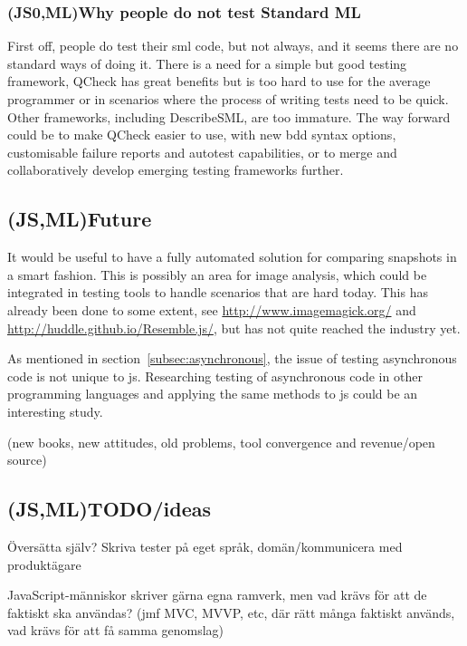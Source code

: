 \documentclass[11pt]{article}
\begin{document}
\subsubsection{(JS0,ML)Why people do not test Standard ML}
\label{subsubsec:whynotsml}

First off, people do test their \gls{sml} code, but not always, and it seems there are no standard ways of doing it. There is a need for a simple but good testing framework, QCheck has great benefits but is too hard to use for the average programmer or in scenarios where the process of writing tests need to be quick. Other frameworks, including DescribeSML, are too immature. The way forward could be to make QCheck easier to use, with new \gls{bdd} syntax options, customisable failure reports and autotest capabilities, or to merge and collaboratively develop emerging testing frameworks further.

\subsection{(JS,ML)Future}

It would be useful to have a fully automated solution for comparing snapshots in a smart fashion. This is possibly an area for image analysis, which could be integrated in testing tools to handle scenarios that are hard today. This has already been done to some extent, see \url{http://www.imagemagick.org/} and \url{http://huddle.github.io/Resemble.js/}, but has not quite reached the industry yet.

As mentioned in section~\ref{subsec:asynchronous}, the issue of testing asynchronous code is not unique to \gls{js}. Researching testing of asynchronous code in other programming languages and applying the same methods to \gls{js} could be an interesting study.

(new books, new attitudes, old problems, tool convergence and revenue/open source)

\subsection{(JS,ML)TODO/ideas}

Översätta själv? Skriva tester på eget språk, domän/kommunicera med produktägare

JavaScript-människor skriver gärna egna ramverk, men vad krävs för att de faktiskt ska användas? (jmf MVC, MVVP, etc, där rätt många faktiskt används, vad krävs för att få samma genomslag)
\end{document}
